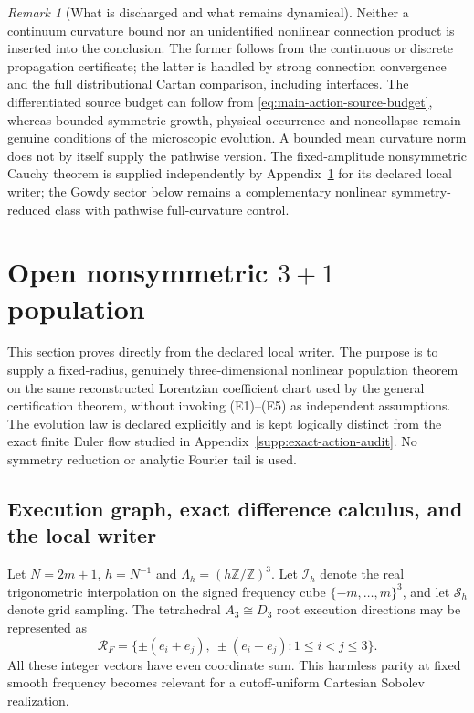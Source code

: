 \documentclass[11pt]{article}
\theoremstyle{definition}
\theoremstyle{remark}
\newtheorem{remark}[remark]{Remark}
\begin{document}
\begin{remark}[What is discharged and what remains dynamical]
Neither a continuum curvature bound nor an unidentified nonlinear connection
product is inserted into the conclusion.  The former follows from the
continuous or discrete propagation certificate; the latter is handled by
strong connection convergence and the full distributional Cartan comparison,
including interfaces.  The differentiated source budget can follow from
\eqref{eq:main-action-source-budget}, whereas bounded symmetric growth,
physical occurrence and noncollapse remain genuine conditions of the
microscopic evolution.  A bounded mean curvature norm does not by itself
supply the pathwise version.  The fixed-amplitude nonsymmetric Cauchy theorem
is supplied independently by Appendix~\ref{supp:open-3plus1} for its declared
local writer; the Gowdy sector below remains a complementary nonlinear
symmetry-reduced class with pathwise full-curvature control.
\end{remark}

\section{Open nonsymmetric \texorpdfstring{$3+1$}{3+1} population}
\label{supp:open-3plus1}

This section proves  directly from the declared
local writer.  The purpose is to supply a fixed-radius, genuinely
three-dimensional nonlinear population theorem on the same reconstructed
Lorentzian coefficient chart used by the general certification theorem,
without invoking \textup{(E1)--(E5)} as independent assumptions.  The
evolution law is declared explicitly and is kept logically distinct from the
exact finite Euler flow studied in Appendix~\ref{supp:exact-action-audit}.
No symmetry reduction or analytic Fourier tail is used.

\subsection{Execution graph, exact difference calculus, and the local writer}

Let $N=2m+1$, $h=N^{-1}$ and
$\Lambda_h=(h\mathbb Z/\mathbb Z)^3$.  Let $\mathcal I_h$ denote the real
trigonometric interpolation on the signed frequency cube
$\{-m,\ldots,m\}^3$, and let $\mathcal S_h$ denote grid sampling.  The
tetrahedral $A_3\cong D_3$ root
execution directions may be represented as
\begin{equation}
 \mathcal R_F=\{\pm(e_i+e_j),\ \pm(e_i-e_j):1\le i<j\le3\}.
 \label{eq:supp-open-fcc-roots}
\end{equation}
All these integer vectors have even coordinate sum.  This harmless parity at
fixed smooth frequency becomes relevant for a cutoff-uniform Cartesian
Sobolev realization.
\end{document}
